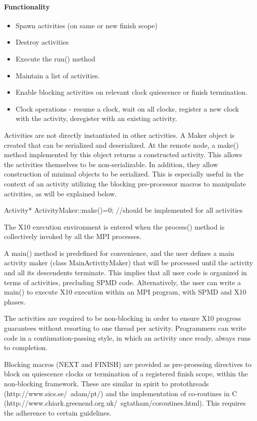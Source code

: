 \documentclass{article}
\begin{document}
\paragraph{Functionality}

\begin{itemize}
\item Spawn activities (on same or new finish scope)
\item Destroy activities
\item Execute the run() method
\item Maintain a list of activities.
\item Enable blocking activities on relevant clock quiescence or finish
  termination. 
\item Clock operations - resume a clock, wait on all clocks, register a
  new clock with the activity, deregister with an existing activity. 
\end{itemize}

Activities are not directly instantiated in other activities. A Maker
object is created that can be serialized and deserialized. At the
remote node, a make() method implemented by this object returns a
constructed activity. This allows the activities themselves to be
non-serializable. In addition, they allow construction of minimal
objects to be serialized. This is especially useful in the context of
an activity utilizing the blocking pre-processor macros to manipulate
activities, as will be explained below.

Activity* ActivityMaker::make()=0; //should be implemented for all activities 

The X10 execution environment is entered when the process() method is
collectively invoked by all the MPI processes. 

A main() method is predefined for convenience, and the user defines a
main activity maker (class MainActivityMaker) that will be processed
until the activity and all its descendents terminate. This implies
that all user code is organized in terms of activities, precluding
SPMD code. Alternatively, the user can write a main() to execute X10
execution within an MPI program, with SPMD and X10 phases. 

The activities are required to be non-blocking in order to ensure X10
progress guarantees without resorting to one thread per activity.
Programmers can write code in a continuation-passing style, in which
an activity once ready, always runs to completion. 

Blocking macros (NEXT and FINISH) are provided as pre-proessing
directives to block on quiescence clocks or termination of a
registered finish scope, within the non-blocking framework. These are
similar in spirit to protothreads (http://www.sics.se/~adam/pt/) and
the implementation of co-routines in C
(http://www.chiark.greenend.org.uk/~sgtatham/coroutines.html). This
requires the adherence to certain guidelines.
\end{document}
